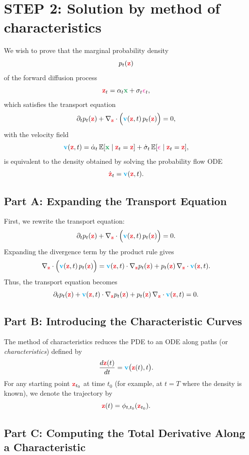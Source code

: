 \documentclass[usenames,dvipsnames]{article}
\newcommand{\myvec}[1]{\mathbf{#1}}
\newcommand{\myvecsym}[1]{\boldsymbol{#1}}
\newcommand{\vx}{\myvec{\textcolor{ForestGreen}{x}}}
\newcommand{\vz}{\myvec{\textcolor{Red}{z}}}
\newcommand{\vv}{\myvec{\textcolor{Cyan}{v}}}
\newcommand{\vepsilon}{\myvecsym{\textcolor{CarnationPink}{\epsilon}}}
\begin{document}
\section*{STEP 2: Solution by method of characteristics}

We wish to prove that the marginal probability density
\[
p_t(\vz)
\]
of the forward diffusion process
\[
\vz_t = \alpha_t \vx + \sigma_t \vepsilon_t,
\]
which satisfies the transport equation
\[
\partial_t p_t(\vz) + \nabla_{\vz} \cdot \Bigl( \vv(\vz,t) \, p_t(\vz) \Bigr) = 0,
\]
with the velocity field
\[
\vv(\vz,t) = \dot{\alpha}_t \, \mathbb{E}[\vx \mid \vz_t = \vz] + \dot{\sigma}_t \, \mathbb{E}[\vepsilon \mid \vz_t = \vz],
\]
is equivalent to the density obtained by solving the probability flow ODE
\[
\dot{\vz}_t = \vv(\vz,t).
\]

\subsection*{Part A: Expanding the Transport Equation}

First, we rewrite the transport equation:
\[
\partial_t p_t(\vz) + \nabla_{\vz} \cdot \Bigl( \vv(\vz,t) \, p_t(\vz) \Bigr) = 0.
\]
Expanding the divergence term by the product rule gives
\[
\nabla_{\vz} \cdot \Bigl( \vv(\vz,t) \, p_t(\vz) \Bigr) = \vv(\vz,t) \cdot \nabla_{\vz} p_t(\vz) + p_t(\vz) \, \nabla_{\vz} \cdot \vv(\vz,t).
\]
Thus, the transport equation becomes
\[
\partial_t p_t(\vz) + \vv(\vz,t) \cdot \nabla_{\vz} p_t(\vz) + p_t(\vz) \, \nabla_{\vz} \cdot \vv(\vz,t) = 0.
\]

\subsection*{Part B: Introducing the Characteristic Curves}

The method of characteristics reduces the PDE to an ODE along paths (or \emph{characteristics}) defined by
\[
\frac{d\vz(t)}{dt} = \vv\bigl(\vz(t), t\bigr).
\]
For any starting point \(\vz_{t_0}\) at time \(t_0\) (for example, at \(t=T\) where the density is known), we denote the trajectory by
\[
\vz(t) = \phi_{t,t_0}(\vz_{t_0}).
\]

\subsection*{Part C: Computing the Total Derivative Along a Characteristic}
\end{document}
